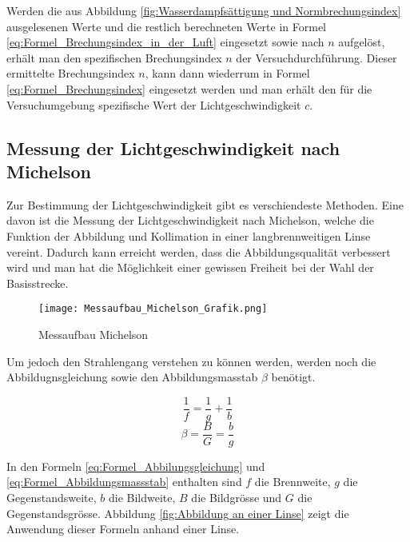 Werden die aus Abbildung \ref{fig:Wasserdampfsättigung und Normbrechungsindex} ausgelesenen Werte und die restlich berechneten Werte in Formel \ref{eq:Formel_Brechungsindex_in_der_Luft} eingesetzt sowie nach $n$ aufgelöst, erhält man den spezifischen Brechungsindex $n$ der Versuchdurchführung. Dieser ermittelte Brechungsindex $n$, kann dann wiederrum in Formel \ref{eq:Formel_Brechungsindex} eingesetzt werden und man erhält den für die Versuchumgebung spezifische Wert der Lichtgeschwindigkeit $c$. 

\subsection{Messung der Lichtgeschwindigkeit nach Michelson}

Zur Bestimmung der Lichtgeschwindigkeit gibt es verschiendeste Methoden. Eine davon ist die Messung der Lichtgeschwindigkeit nach Michelson, welche die Funktion der Abbildung und Kollimation in einer langbrennweitigen Linse vereint. Dadurch kann erreicht werden, dass die Abbildungsqualität verbessert wird und man hat die Möglichkeit einer gewissen Freiheit bei der Wahl der Basisstrecke.

\begin{figure}[htb]
\texttt{[image: Messaufbau\_Michelson\_Grafik.png]}
\caption{Messaufbau Michelson}
\label{fig:Messaufbau Michelson}
\end{figure}

Um jedoch den Strahlengang verstehen zu können werden, werden noch die Abbildugnsgleichung sowie den Abbildungsmasstab $\beta$ benötigt.

\begin{equation}
\dfrac{1}{f} = \dfrac{1}{g} + \dfrac{1}{b}
\label{eq:Formel_Abbilungsgleichung}
\end{equation}
\begin{equation}
\beta = \frac{B}{G} = \frac{b}{g}
\label{eq:Formel_Abbildungsmassstab}
\end{equation}

In den Formeln \ref{eq:Formel_Abbilungsgleichung} und \ref{eq:Formel_Abbildungsmassstab} enthalten sind $f$ die Brennweite, $g$ die Gegenstandsweite, $b$ die Bildweite, $B$ die Bildgrösse und $G$ die Gegenstandsgrösse. Abbildung \ref{fig:Abbildung an einer Linse} zeigt die Anwendung dieser Formeln anhand einer Linse.

